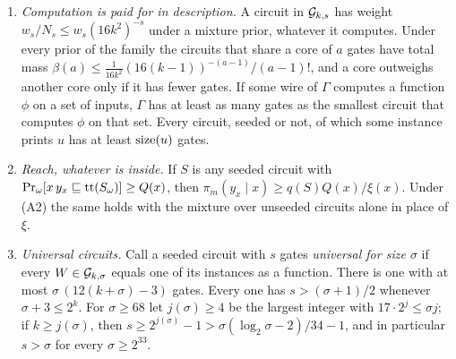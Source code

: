 \begin{theorem}
\begin{enumerate}[label=(\alph*),leftmargin=2em,itemsep=2pt,topsep=2pt]
$s$ is smaller than the size of every $W_i$, $\ w_s/N_s>N\,w_\sigma/N_\sigma$, and $\csize(x_i)\le s$ for all
$i$. If every $W_i$ is a smallest circuit for its own context, then $\sum_iq(S)\varpi_i/q(W_i)\le1$ for every
seeded $S$.
\item \emph{Computation is paid for in description.} A circuit in $\mathcal G_{k,s}$ has weight
$w_s/N_s\le w_s(16k^2)^{-s}$ under a mixture prior, whatever it computes. Under every prior of the family the
circuits that share a core of $a$ gates have total mass $\beta(a)\le\frac1{16k^2}(16(k-1))^{-(a-1)}/(a-1)!$,
and a core outweighs another core only if it has fewer gates. If some wire of $\Gamma$ computes a function
$\phi$ on a set of inputs, $\Gamma$ has at least as many gates as the smallest circuit that computes $\phi$ on
that set. Every circuit, seeded or not, of which some instance prints $u$ has at least $\mathrm{size}(u)$ gates.
\item \emph{Reach, whatever is inside.} If $S$ is any seeded circuit with
$\Pr_\omega[x\,y_x\sqsubseteq\mathrm{tt}(S_\omega)]\ge Q(x)$, then $\pi_m(y_x\mid x)\ge q(S)Q(x)/\xi(x)$. Under (A2) the
same holds with the mixture over unseeded circuits alone in place of $\xi$.
\item \emph{Universal circuits.} Call a seeded circuit with $s$ gates \emph{universal for size $\sigma$} if
every $W\in\mathcal G_{k,\sigma}$ equals one of its instances as a function. There is one with at most
$\sigma\,(12(k+\sigma)-3)$ gates. Every one has $s>(\sigma+1)/2$ whenever $\sigma+3\le2^k$. For $\sigma\ge68$
let $j(\sigma)\ge4$ be the largest integer with $17\cdot2^j\le\sigma j$; if $k\ge j(\sigma)$, then
$s\ge2^{j(\sigma)}-1>\sigma(\log_2\sigma-2)/34-1$, and in particular $s>\sigma$ for every $\sigma\ge2^{33}$.
\end{enumerate}
\end{theorem}
